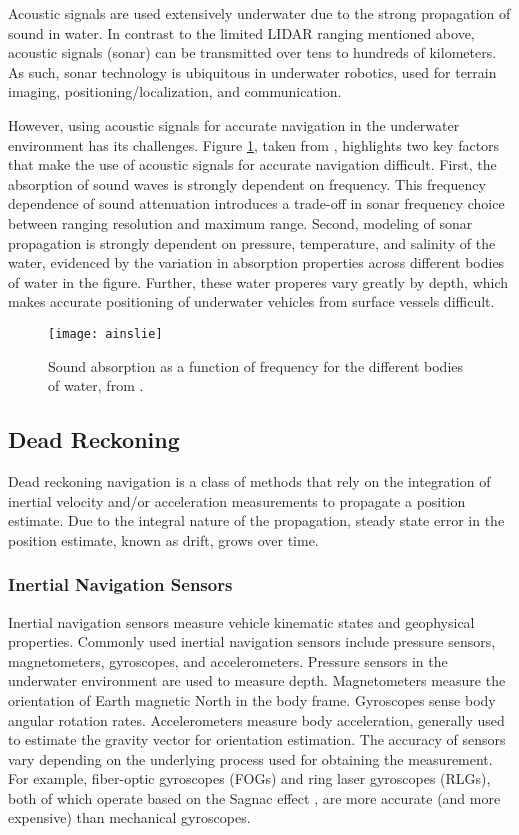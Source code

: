 Acoustic signals are used extensively underwater due to the strong propagation of sound in water.
In contrast to the limited LIDAR ranging mentioned above, acoustic signals (sonar) can be transmitted over tens to hundreds of kilometers.
As such, sonar technology is ubiquitous in underwater robotics, used for terrain imaging, positioning/localization, and communication.

However, using acoustic signals for accurate navigation in the underwater environment has its challenges.
Figure \ref{fig:ainslie}, taken from \cite{Ainslie1998}, highlights two key factors that make the use of acoustic signals for accurate navigation difficult.
First, the absorption of sound waves is strongly dependent on frequency.  
This frequency dependence of sound attenuation introduces a trade-off in sonar frequency choice between ranging resolution and maximum range.
Second, modeling of sonar propagation is strongly dependent on pressure, temperature, and salinity of the water, evidenced by the variation in absorption properties across different bodies of water in the figure.
Further, these water properes vary greatly by depth, which makes accurate positioning of underwater vehicles from surface vessels difficult.

\begin{figure}[!h]
	\centering
		\texttt{[image: ainslie]}
	\caption{Sound absorption as a function of frequency for the different bodies of water, from \cite{Ainslie1998}. }
	\label{fig:ainslie}
\end{figure}

\subsection{Dead Reckoning}
\label{intro.Existing.Dead}

Dead reckoning navigation is a class of methods that rely on the integration of inertial velocity and/or acceleration measurements to propagate a position estimate.
Due to the integral nature of the propagation, steady state error in the position estimate, known as drift, grows over time.

\subsubsection{Inertial Navigation Sensors}
\label{intro.Existing.Dead.Inertial}

Inertial navigation sensors measure vehicle kinematic states and geophysical properties. 
Commonly used inertial navigation sensors include pressure sensors, magnetometers, gyroscopes, and accelerometers.  
Pressure sensors in the underwater environment are used to measure depth.  
Magnetometers measure the orientation of Earth magnetic North in the body frame.  
Gyroscopes sense body angular rotation rates.  
Accelerometers measure body acceleration, generally used to estimate the gravity vector for orientation estimation. 
The accuracy of sensors vary depending on the underlying process used for obtaining the measurement.  For example, fiber-optic gyroscopes (FOGs) and ring laser gyroscopes (RLGs), both of which operate based on the Sagnac effect \cite{Arditty1981}, are more accurate (and more expensive) than mechanical gyroscopes.

